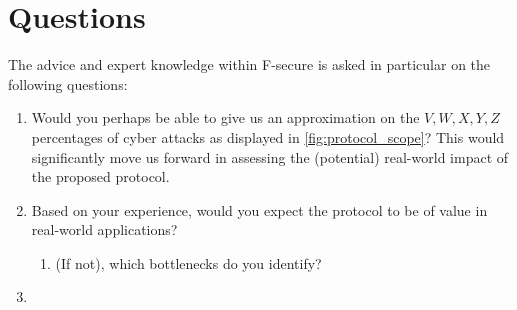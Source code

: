 \section{Questions}
\label{sec:questions}
The advice and expert knowledge within F-secure is asked in particular on the following questions:
\begin{enumerate}
    \item Would you perhaps be able to give us an approximation on the $V,W,X,Y,Z$ percentages of cyber attacks as displayed in \cref{fig:protocol_scope}? This would significantly move us forward in assessing the (potential) real-world impact of the proposed protocol.
    \item Based on your experience, would you expect the protocol to be of value in real-world applications?
    \begin{enumerate}
        \item (If not), which bottlenecks do you identify?
    \end{enumerate}
    \item 
\end{enumerate}